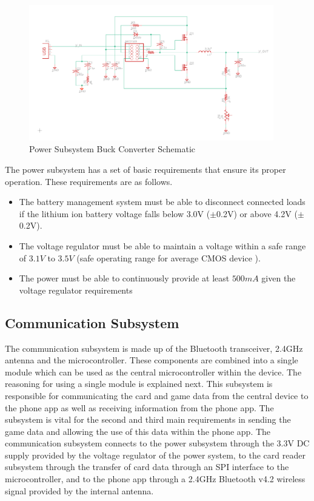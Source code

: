 \documentclass[12pt]{article}
\begin{document}
\begin{figure}[!h]
	\centering
	\includegraphics[width=0.95\textwidth]{Power_Buck_Schem.png}
	\caption{Power Subsystem Buck Converter Schematic}
	\label{fig:buck_schem}
\end{figure}

The power subsystem has a set of basic requirements that ensure its proper operation. These requirements are as follows.

\begin{itemize}
\item The battery management system must be able to disconnect connected loads if the lithium ion battery voltage falls below 3.0V ($\pm$0.2V) or above 4.2V ($\pm$0.2V).
\item The voltage regulator must be able to maintain a voltage within a safe range of $3.1V$ to $3.5V$ (safe operating range for average CMOS device \cite{TI_inverter}).
\item The power must be able to continuously provide at least $500mA$ given the voltage regulator requirements
\end{itemize}

\subsection{Communication Subsystem}

The communication subsystem is made up of the Bluetooth transceiver, 2.4GHz antenna and the microcontroller. These components are combined into a single module which can be used as the central microcontroller within the device. The reasoning for using a single module is explained next. This subsystem is responsible for communicating the card and game data from the central device to the phone app as well as receiving information from the phone app. The subsystem is vital for the second and third main requirements in sending the game data and allowing the use of this data within the phone app. The communication subsystem connects to the power subsystem through the 3.3V DC supply provided by the voltage regulator of the power system, to the card reader subsystem through the transfer of card data through an SPI interface to the microcontroller, and to the phone app through a 2.4GHz Bluetooth v4.2 wireless signal provided by the internal antenna.
\end{document}
